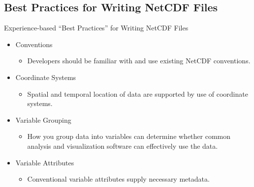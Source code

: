 \documentclass[compress,11pt,xcolor=svgnames,aspectratio=169]{beamer}
\begin{document}
\subsection{Best Practices for Writing NetCDF Files}

\begin{frame}[fragile]{Experience-based ``Best Practices'' for Writing NetCDF Files}

    \begin{itemize}
    \setlength\itemsep{0.4cm}

        \item	Conventions
        \begin{itemize}
          \item Developers should be familiar with and use existing NetCDF conventions.
        \end{itemize}

        \item	Coordinate Systems
        \begin{itemize}
          \item Spatial and temporal location of data are supported by use of coordinate systems.
        \end{itemize}

        \item	Variable Grouping
        \begin{itemize}
          \item How you group data into variables can determine whether common analysis and visualization software can effectively use the data.
        \end{itemize}

        \item	Variable Attributes
        \begin{itemize}
          \item Conventional variable attributes supply necessary metadata.
        \end{itemize}

    \end{itemize}

\nocite{netcdf}

\end{frame}
\end{document}
